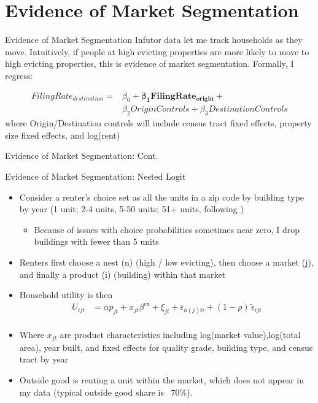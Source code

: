 \documentclass[10pt, xcolor=dvipsnames]{beamer}
\begin{document}
\section{Evidence of Market Segmentation}

\begin{frame}{Evidence of Market Segmentation}
    Infutor data let me track households as they move. Intuitively, if people at high evicting properties are more likely to move to high evicting properties, this is evidence of market segmentation. Formally, I regress:

    \begin{align*}
        FilingRate_{destination} = &\beta_0 +\mathbf{\beta_1FilingRate_{origin}} + \\&\beta_2OriginControls + \beta_3DestinationControls 
    \end{align*}
    where Origin/Destination controls will include census tract fixed effects, property size fixed effects, and log(rent)
\end{frame}

\begin{frame}{Evidence of Market Segmentation: Cont.}
    \tiny
    
\end{frame}

\begin{frame}{Evidence of Market Segmentation: Nested Logit}
    \begin{itemize}
        \item Consider a renter's choice set as all the units in a zip code by building type by year (1 unit; 2-4 units, 5-50 units; 51+ units, following \cite{framoutar2024market, calderwang2024algorithmic})
        \begin{itemize}
            \item Because of issues with choice probabilities sometimes near zero, I drop buildings with fewer than 5 units
        \end{itemize}
        \pause
        \item Renters first choose a nest (n) (high / low evicting), then choose a market (j), and finally a product (i) (building) within that market
        \pause
        \item Household utility is then \begin{align}
            U_{ijt}
              &= \alpha p_{jt} + x_{jt}\beta^{\mathrm{ex}} + \xi_{jt}
                 + \bar{\epsilon}_{h(j)ti} + (1-\rho)\,\tilde{\epsilon}_{ijt} \tag{6} \\[6pt]
                 \end{align}
        \item Where $x_{jt}$ are product characteristics including log(market value),log(total area), year built, and fixed effects for quality grade, building type, and census tract by year
        \pause
        \item Outside good is renting a unit within the market, which does not appear in my data (typical outside good share is ~70\%).
    \end{itemize}
    
\end{frame}
\end{document}

